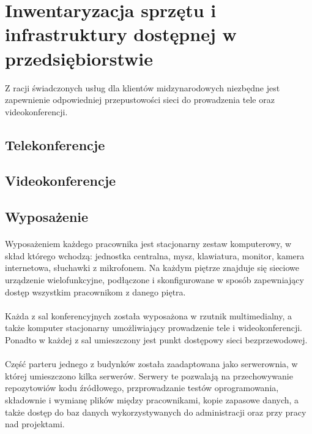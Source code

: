 \section{Inwentaryzacja sprzętu i infrastruktury dostępnej w przedsiębiorstwie}

Z racji świadczonych usług dla klientów midzynarodowych niezbędne jest zapewnienie odpowiedniej przepustowości sieci do prowadzenia tele oraz videokonferencji.


\subsection{Telekonferencje}


\subsection{Videokonferencje}


\subsection{Wyposażenie}
\paragraph{}
Wyposażeniem każdego pracownika jest stacjonarny zestaw komputerowy, w skład którego wchodzą: jednostka centralna, mysz, klawiatura, monitor, kamera internetowa, słuchawki z mikrofonem.
Na każdym piętrze znajduje się sieciowe urządzenie wielofunkcyjne, podłączone i skonfigurowane w sposób zapewniający dostęp wszystkim pracownikom z danego piętra.

\paragraph{}
Każda z sal konferencyjnych została wyposażona w rzutnik multimedialny, a także komputer stacjonarny umożliwiający prowadzenie tele i wideokonferencji.
Ponadto w każdej z sal umieszczony jest punkt dostępowy sieci bezprzewodowej.

\paragraph{}
Część parteru jednego z budynków została zaadaptowana jako serwerownia, w której umieszczono kilka serwerów. Serwery te pozwalają na przechowywanie repozytowiów kodu źródłowego, przprowadzanie testów oprogramowania, składownie i wymianę plików między pracownikami, kopie zapasowe danych, a także dostęp do baz danych wykorzystywanych do administracji oraz przy pracy nad projektami.

